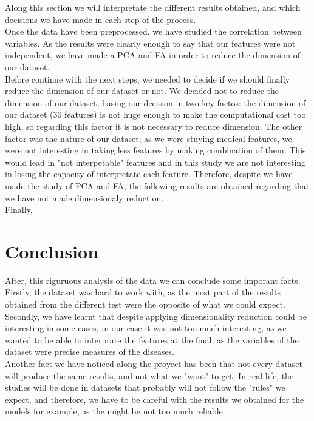 \documentclass[10pt,a4paper]{article}
\theoremstyle{definition}
\theoremstyle{definition}
\begin{document}
Along this section we will interpretate the different results obtained, and which decisions we have made in each step of the process. \\

Once the data have been preprocessed, we have studied the correlation between variables. As the results were clearly enough to say that our features were not independent, we have made a PCA and FA in order to reduce the dimension of our dataset. \\




Before continue with the next steps, we needed to decide if we should finally reduce the dimension of our dataset or not. We decided not to reduce the dimension of our dataset, basing our decision in two key factos: the dimension of our dataset (30 features) is not huge enough to make the computational cost too high, so regarding this factor it is not necessary to reduce dimension. The other factor was the nature of our dataset; as we were stuying medical features, we were not interesting in taking less features by making combination of them. This would lead in "not interpetable" features and in this study we are not interesting in losing the capacity of interpretate each feature. Therefore, despite we have made the study of PCA and FA, the following results are obtained regarding that we have not made dimensionaly reduction. \\


Finally, 


\section{Conclusion}

After, this riguruous analysis of the data  we can conclude some imporant facts. Firstly, the dataset was hard to work with, as the most part of the results obtained from the different test were the opposite of what we could expect. Secondly, we have learnt that despite applying dimensionality reduction could be interesting in some cases, in our case it was not too much interesting, as we wanted to be able to interprate the features at the final, as the variables of the dataset were precise measures of the diseases. \\

Another fact we have noticed along the proyect has been that not every dataset will produce the same results, and not what we "want" to get. In real life, the studies will be done in datasets that probably will not follow the "rules" we expect, and therefore, we have to be careful with the results we obtained for the models for example, as the might be not too much reliable.\\
\end{document}
